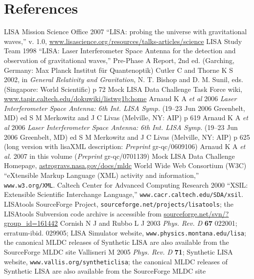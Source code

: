 \documentclass{iopart}
\begin{document}
\section*{References}
\begin{thebibliography}{10}
 LISA Mission Science Office 2007 ``LISA: probing the universe with gravitational waves,'' v. 1.0, \url{www.lisascience.org/resources/talks-articles/science}
 LISA Study Team 1998 ``LISA: Laser Interferometer Space Antenna for the detection and observation of gravitational waves,'' Pre-Phase A Report, 2nd ed. (Garching, Germany: Max Planck Institut f\"ur Quantenoptik)
 Cutler C and Thorne K S 2002, in \emph{General Relativity and Gravitation}, N. T. Bishop and D. M. Sunil, eds. (Singapore: World Scientific) p 72
 Mock LISA Data Challenge Task Force wiki, \url{www.tapir.caltech.edu/dokuwiki/listwg1b:home}
 Arnaud K A \textit{et al} 2006 \textit{Laser Interferometer Space Antenna: 6th Int. LISA Symp.} (19--23 Jun 2006 Greenbelt, MD) ed S M Merkowitz and J C Livas (Melville, NY: AIP) p 619
 Arnaud K A \textit{et al} 2006 \textit{Laser Interferometer Space Antenna: 6th Int. LISA Symp.} (19--23 Jun 2006 Greenbelt, MD) ed S M Merkowitz and J C Livas (Melville, NY: AIP) p 625 (long version with lisaXML description: \textit{Preprint} gr-qc/0609106)
 Arnaud K A {\it et al.} 2007 in this volume (\textit{Preprint} gr-qc/0701139)
%
 Mock LISA Data Challenge Homepage, \url{astrogravs.nasa.gov/docs/mldc}
 World Wide Web Consortium (W3C) ``eXtensible Markup Language (XML) activity and information,'' \texttt{www.w3.org/XML}.
 Caltech Center for Advanced Computing Research 2000 ``XSIL: Extensible Scientific Interchange Language,'' \texttt{www.cacr.caltech.edu/SDA/xsil}.
 LISAtools SourceForge Project, \texttt{sourceforge.net/projects/lisatools}; the LISAtools Subversion code archive is accessible from \url{sourceforge.net/svn/?group_id=161442}
 Cornish N J and Rubbo L J 2003 \emph{Phys. Rev. D} \textbf{67} 022001; erratum-ibid. 029905; LISA Simulator website, \texttt{www.physics.montana.edu/lisa}; the canonical MLDC releases of Synthetic LISA are also available from the SourceForge MLDC site \cite{lisatools}
 Vallisneri M 2005 \emph{Phys. Rev. D} \textbf{71}; Synthetic LISA website, \texttt{www.vallis.org/syntheticlisa}; the canonical MLDC releases of Synthetic LISA are also available from the SourceForge MLDC site \cite{lisatools}

\end{thebibliography}
\end{document}
